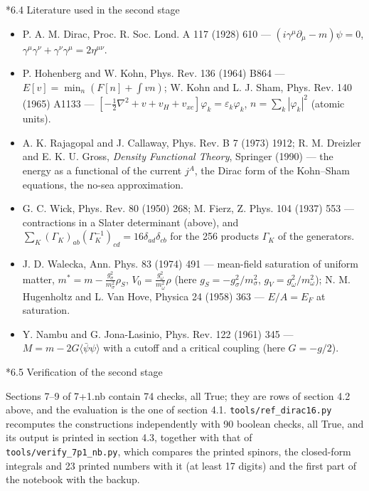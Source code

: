 \documentclass[10pt,a4paper]{article}
\makeatletter
\renewcommand\subsection{\@startsection{subsection}{2}{\z@}{-3.25ex\@plus -1ex \@minus -.2ex}{1.5ex \@plus .2ex}{\normalfont\large\bfseries\raggedright}}
\makeatother
\begin{document}
\subsection*{6.4 Literature used in the second stage}
\begin{itemize}
\item P. A. M. Dirac, Proc. R. Soc. Lond. A 117 (1928) 610 — $(i\gamma^\mu\partial_\mu-m)\psi=0$, $\gamma^\mu\gamma^\nu+\gamma^\nu\gamma^\mu=2\eta^{\mu\nu}$.
\item P. Hohenberg and W. Kohn, Phys. Rev. 136 (1964) B864 — $E[v]=\min_n(F[n]+\int vn)$; W. Kohn and L. J. Sham, Phys. Rev. 140 (1965) A1133 — $[-\frac12\nabla^2+v+v_H+v_{xc}]\varphi_k=\varepsilon_k\varphi_k$, $n=\sum_k|\varphi_k|^2$ (atomic units).
\item A. K. Rajagopal and J. Callaway, Phys. Rev. B 7 (1973) 1912; R. M. Dreizler and E. K. U. Gross, \emph{Density Functional Theory}, Springer (1990) — the energy as a functional of the current $j^A$, the Dirac form of the Kohn–Sham equations, the no-sea approximation.
\item G. C. Wick, Phys. Rev. 80 (1950) 268; M. Fierz, Z. Phys. 104 (1937) 553 — contractions in a Slater determinant (above), and $\sum_K(\Gamma_K)_{ab}(\Gamma_K^{-1})_{cd}=16\delta_{ad}\delta_{cb}$ for the 256 products $\Gamma_K$ of the generators.
\item J. D. Walecka, Ann. Phys. 83 (1974) 491 — mean-field saturation of uniform matter, $m^*=m-\frac{g_\sigma^2}{m_\sigma^2}\rho_S$, $V_0=\frac{g_\omega^2}{m_\omega^2}\rho$ (here $g_S=-g_\sigma^2/m_\sigma^2$, $g_V=g_\omega^2/m_\omega^2$); N. M. Hugenholtz and L. Van Hove, Physica 24 (1958) 363 — $E/A=E_F$ at saturation.
\item Y. Nambu and G. Jona-Lasinio, Phys. Rev. 122 (1961) 345 — $M=m-2G\langle\bar\psi\psi\rangle$ with a cutoff and a critical coupling (here $G=-g/2$).
\end{itemize}
\subsection*{6.5 Verification of the second stage}
Sections 7–9 of 7+1.nb contain 74 checks, all True; they are rows of section 4.2 above, and the evaluation is the one of section 4.1. \texttt{tools/\allowbreak{}ref\_\allowbreak{}dirac16.py} recomputes the constructions independently with 90 boolean checks, all True, and its output is printed in section 4.3, together with that of \texttt{tools/\allowbreak{}verify\_\allowbreak{}7p1\_\allowbreak{}nb.py}, which compares the printed spinors, the closed-form integrals and 23 printed numbers with it (at least 17 digits) and the first part of the notebook with the backup.
\end{document}
